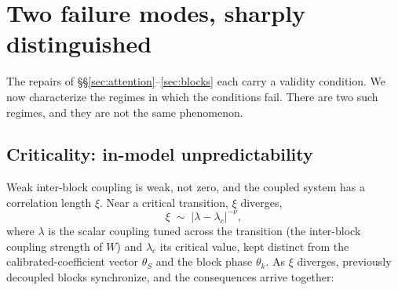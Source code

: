 \documentclass[11pt]{article}
\begin{document}
\section{Two failure modes, sharply distinguished}
\label{sec:failure}

The repairs of \S\S\ref{sec:attention}--\ref{sec:blocks} each carry a validity condition. We now characterize the regimes in which the conditions fail. There are two such regimes, and they are not the same phenomenon.

\subsection{Criticality: in-model unpredictability}
\label{sec:criticality}

Weak inter-block coupling is weak, not zero, and the coupled system has a correlation length $\xi$. Near a critical transition, $\xi$ diverges,
\begin{equation}
\xi \;\sim\; |\lambda - \lambda_c|^{-\nu},
\end{equation}
where $\lambda$ is the scalar coupling tuned across the transition (the inter-block coupling strength of $W$) and $\lambda_c$ its critical value, kept distinct from the calibrated-coefficient vector $\theta_S$ and the block phase $\theta_k$. As $\xi$ diverges, previously decoupled blocks synchronize, and the consequences arrive together:
\end{document}
